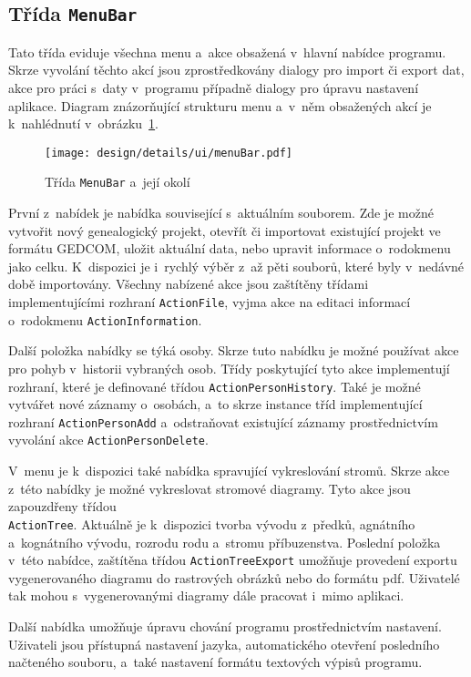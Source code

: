 		\subsection*{Třída \texttt{MenuBar}}
		Tato třída eviduje všechna menu a~akce obsažená v~hlavní nabídce programu. Skrze vyvolání těchto akcí jsou zprostředkovány dialogy pro import či export dat, akce pro práci s~daty v~programu případně dialogy pro úpravu nastavení aplikace. Diagram znázorňující strukturu menu a~v~něm obsažených akcí je k~nahlédnutí v~obrázku~\ref{fig:designDetailMenuBar}.\par
		\begin{figure}[t!]
			\centering
			\texttt{[image: design/details/ui/menuBar.pdf]}
			\caption{Třída \texttt{MenuBar} a~její okolí}
			\label{fig:designDetailMenuBar}
		\end{figure}
		První z~nabídek je nabídka související s~aktuálním souborem. Zde je možné vytvořit nový genealogický projekt, otevřít či importovat existující projekt ve formátu GEDCOM, uložit aktuální data, nebo upravit informace o~rodokmenu jako celku. K~dispozici je i~rychlý výběr z~až pěti souborů, které byly v~nedávné době importovány. Všechny nabízené akce jsou zaštítěny třídami implementujícími rozhraní \texttt{ActionFile}, vyjma akce na editaci informací o~rodokmenu \texttt{ActionInformation}. \par
		Další položka nabídky se týká osoby. Skrze tuto nabídku je možné používat akce pro pohyb v~historii vybraných osob. Třídy poskytující tyto akce implementují rozhraní, které je definované třídou \texttt{ActionPersonHistory}. Také je možné vytvářet nové záznamy o~osobách, a~to skrze instance tříd implementující rozhraní \texttt{ActionPersonAdd} a~odstraňovat existující záznamy prostřednictvím vyvolání akce \texttt{ActionPersonDelete}. \par
		V~menu je k~dispozici také nabídka spravující vykreslování stromů. Skrze akce z~této nabídky je možné vykreslovat stromové diagramy. Tyto akce jsou zapouzdřeny třídou \\ \texttt{ActionTree}. Aktuálně je k~dispozici tvorba vývodu z~předků, agnátního a~kognátního vývodu, rozrodu rodu a~stromu příbuzenstva. Poslední položka v~této nabídce, zaštítěna třídou \texttt{ActionTreeExport} umožňuje provedení exportu vygenerovaného diagramu do rastrových obrázků nebo do formátu pdf. Uživatelé tak mohou s~vygenerovanými diagramy dále pracovat i~mimo aplikaci.\par
		Další nabídka umožňuje úpravu chování programu prostřednictvím nastavení. Uživateli jsou přístupná nastavení jazyka, automatického otevření posledního načteného souboru, a~také nastavení formátu textových výpisů programu.\par
